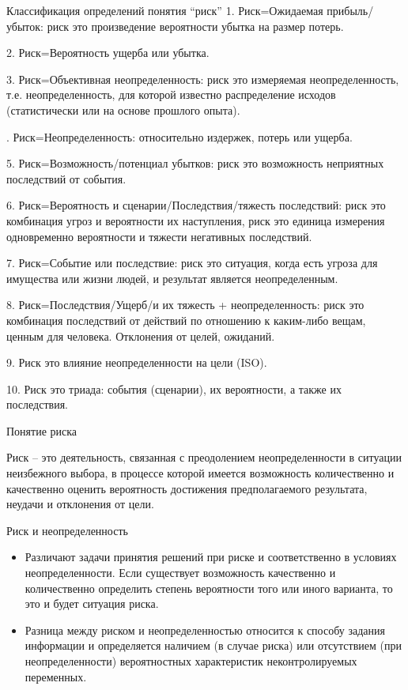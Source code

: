 \documentclass[_fin_decisions_lectures.tex]{subfiles}
\begin{document}
\begin{frame}[allowframebreaks]{Классификация определений понятия ``риск''}
1. Риск=Ожидаемая прибыль/убыток: риск это произведение вероятности убытка на размер потерь.

2. Риск=Вероятность ущерба или убытка.

3. Риск=Объективная неопределенность: риск это измеряемая неопределенность, т.е. неопределенность, для которой известно распределение исходов (статистически или на основе прошлого опыта).

. Риск=Неопределенность: относительно издержек, потерь или ущерба.

5. Риск=Возможность/потенциал убытков: риск это возможность неприятных последствий от события.

\pagebreak

6. Риск=Вероятность и сценарии/Последствия/тяжесть последствий: риск это комбинация угроз и вероятности их наступления, риск это единица измерения одновременно вероятности и тяжести негативных последствий.

7. Риск=Событие или последствие: риск это ситуация, когда есть угроза для имущества или жизни людей, и результат является неопределенным.

\pagebreak

8. Риск=Последствия/Ущерб/и их тяжесть + неопределенность: риск это комбинация последствий от действий по отношению к каким-либо вещам, ценным для человека. Отклонения от целей, ожиданий.

9. Риск это влияние неопределенности на цели (ISO).

10. Риск это триада: события (сценарии), их вероятности, а также их последствия.

\end{frame}
\begin{frame}{Понятие риска}
\begin{block}{Риск}
\quad – это деятельность, связанная с преодолением неопределенности в ситуации неизбежного выбора, в процессе которой имеется возможность количественно и качественно оценить вероятность достижения предполагаемого результата, неудачи и отклонения от цели.
\end{block}
\end{frame}
\begin{frame}[ allowframebreaks ]{Риск и неопределенность}
  \begin{itemize}
  \item
Различают задачи принятия решений при риске и соответственно в условиях неопределенности. Если существует возможность качественно и количественно определить степень вероятности того или иного варианта, то это и будет ситуация риска.
\pagebreak
  \item
Разница между риском и неопределенностью относится к способу задания информации и определяется наличием (в случае риска) или отсутствием (при неопределенности) вероятностных характеристик неконтролируемых переменных. 
  \end{itemize}
\end{frame}
\end{document}
